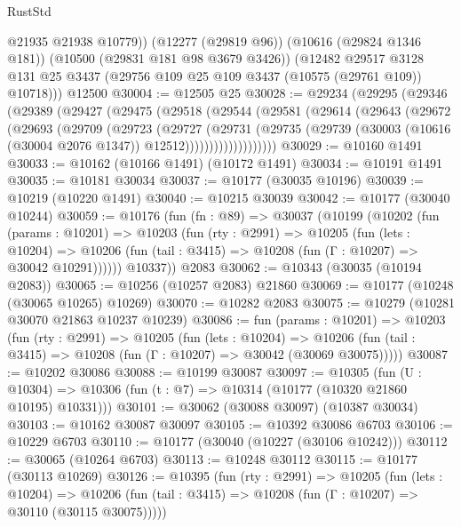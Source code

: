 \begin{lexlean}{RustStd}
\begin{coremodule}
          @21935
          @21938
          @10779))
      (@12277 (@29819 @96))
      (@10616 (@29824 @1346 @181))
      (@10500 (@29831 @181 @98 @3679 @3426))
      (@12482
        @29517
        @3128
        @131
        @25
        @3437
        (@29756 @109 @25 @109 @3437 (@10575 (@29761 @109)) @10718)))
    @12500
@30004 := @12505 @25
@30028 := @29234
    (@29295
      (@29346
        (@29389
          (@29427
            (@29475
              (@29518
                (@29544
                  (@29581
                    (@29614
                      (@29643
                        (@29672
                          (@29693
                            (@29709
                              (@29723
                                (@29727
                                  (@29731
                                    (@29735
                                      (@29739
                                        (@30003
                                          (@10616 (@30004 @2076 @1347))
                                          @12512)))))))))))))))))))
@30029 := @10160 @1491
@30033 := @10162 (@10166 @1491) (@10172 @1491)
@30034 := @10191 @1491
@30035 := @10181 @30034
@30037 := @10177 (@30035 @10196)
@30039 := @10219 (@10220 @1491)
@30040 := @10215 @30039
@30042 := @10177 (@30040 @10244)
@30059 := @10176
    (fun (fn : @89) =>
    @30037
      (@10199
        (@10202
          (fun (params : @10201) =>
          @10203
            (fun (rty : @2991) =>
            @10205
              (fun (lets : @10204) =>
              @10206 (fun (tail : @3415) => @10208 (fun (Γ : @10207) => @30042 @10291))))))
        @10337))
    @2083
@30062 := @10343 (@30035 (@10194 @2083))
@30065 := @10256 (@10257 @2083) @21860
@30069 := @10177 (@10248 (@30065 @10265) @10269)
@30070 := @10282 @2083
@30075 := @10279 (@10281 @30070 @21863 @10237 @10239)
@30086 := fun (params : @10201) =>
  @10203
    (fun (rty : @2991) =>
    @10205
      (fun (lets : @10204) =>
      @10206 (fun (tail : @3415) => @10208 (fun (Γ : @10207) => @30042 (@30069 @30075)))))
@30087 := @10202 @30086
@30088 := @10199 @30087
@30097 := @10305
    (fun (U : @10304) => @10306 (fun (t : @7) => @10314 (@10177 (@10320 @21860 @10195) @10331)))
@30101 := @30062 (@30088 @30097) (@10387 @30034)
@30103 := @10162 @30087 @30097
@30105 := @10392 @30086 @6703
@30106 := @10229 @6703
@30110 := @10177 (@30040 (@10227 (@30106 @10242)))
@30112 := @30065 (@10264 @6703)
@30113 := @10248 @30112
@30115 := @10177 (@30113 @10269)
@30126 := @10395
    (fun (rty : @2991) =>
    @10205
      (fun (lets : @10204) =>
      @10206 (fun (tail : @3415) => @10208 (fun (Γ : @10207) => @30110 (@30115 @30075)))))

\end{coremodule}
\end{lexlean}
